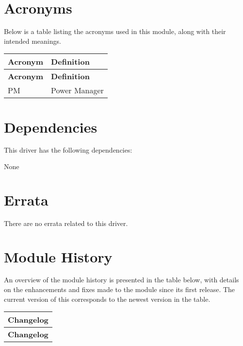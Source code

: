 \hypertarget{asfdoc_sam0_system_extra_asfdoc_sam0_system_extra_acronyms}{}\section{Acronyms}\label{asfdoc_sam0_system_extra_asfdoc_sam0_system_extra_acronyms}
Below is a table listing the acronyms used in this module, along with their intended meanings.

\tabulinesep=1mm
\begin{longtabu}spread 0pt [c]{*{2}{|X[-1]}|}
\hline
\cellcolor{\tableheadbgcolor}\textbf{ Acronym }&\cellcolor{\tableheadbgcolor}\textbf{ Definition  }\\
\endfirsthead
\hline
\endfoot
\hline
\cellcolor{\tableheadbgcolor}\textbf{ Acronym }&\cellcolor{\tableheadbgcolor}\textbf{ Definition  }\\
\endhead
PM &Power Manager  \\
\end{longtabu}
\hypertarget{asfdoc_sam0_system_extra_asfdoc_sam0_system_extra_dependencies}{}\section{Dependencies}\label{asfdoc_sam0_system_extra_asfdoc_sam0_system_extra_dependencies}
This driver has the following dependencies\+:


\begin{DoxyItemize}
\item None
\end{DoxyItemize}\hypertarget{asfdoc_sam0_system_extra_asfdoc_sam0_system_extra_errata}{}\section{Errata}\label{asfdoc_sam0_system_extra_asfdoc_sam0_system_extra_errata}
There are no errata related to this driver.\hypertarget{asfdoc_sam0_system_extra_asfdoc_sam0_system_extra_history}{}\section{Module History}\label{asfdoc_sam0_system_extra_asfdoc_sam0_system_extra_history}
An overview of the module history is presented in the table below, with details on the enhancements and fixes made to the module since its first release. The current version of this corresponds to the newest version in the table.

\tabulinesep=1mm
\begin{longtabu}spread 0pt [c]{*{1}{|X[-1]}|}
\hline
\cellcolor{\tableheadbgcolor}\textbf{ Changelog  }\\
\endfirsthead
\hline
\endfoot
\hline
\cellcolor{\tableheadbgcolor}\textbf{ Changelog  }\\
\endhead
\end{longtabu}
